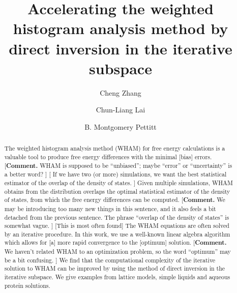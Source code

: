 \documentclass[aip,jcp,preprint,superscriptaddress]{revtex4-1}
\begin{document}
\newcommand{\vct}[1]{\mathbf{#1}}
\newcommand{\vx}{\vct{x}}
\newcommand{\vy}{\vct{y}}
\newcommand{\Z}{\mathcal{Z}}
\newcommand{\E}{\mathcal{E}}
\newcommand{\Ham}{\mathcal{H}}
\newcommand{\W}{\mathcal{W}}
\newcommand{\A}{\mathcal{A}}

\newcommand{\repl}[2]{{\color{gray} [#1] }{\color{blue} #2}}
\newcommand{\add}[1]{{\color{blue} #1}}
\newcommand{\del}[1]{{\color{gray} [#1]}}
\newcommand{\note}[1]{{\color{OliveGreen}\small [\textbf{Comment.} #1]}}



\title{Accelerating the weighted histogram analysis method
by direct inversion in the iterative subspace}


\author{Cheng Zhang}
\author{Chun-Liang Lai}
\author{B. Montgomery Pettitt}



\begin{abstract}
The weighted histogram analysis method (WHAM)
for free energy calculations
is a valuable tool to produce
free energy differences with the minimal \repl{bias}{errors}.
\note{
WHAM is supposed to be ``unbiased'';
maybe ``error'' or ``uncertainty'' is a better word?
}
%
\repl{
If we have two (or more) simulations,
we want the best statistical estimator
of the overlap of the density of states.
}
{
Given multiple simulations,
WHAM obtains
from the distribution overlaps
the optimal statistical estimator
of the density of states,
from which the free energy differences
can be computed.
}
%
\note{
We may be introducing too many new things in this sentence,
and it also feels a bit detached from the previous sentence.
The phrase ``overlap of the density of states'' is somewhat vague.
}
%
\repl{This is most often found}{The WHAM equations are often solved}
by an iterative procedure.
%
In this work,
we use a well-known linear algebra algorithm
which allows for
\repl{a}{more}
rapid convergence to the \repl{optimum}{solution}.
%
\note{
We haven't related WHAM to an optimization problem,
so the word ``optimum'' may be a bit confusing.
}
%
We find \add{that} the computational complexity of
the iterative solution to WHAM
can be improved by using the method of
direct inversion in the iterative subspace.
%
We give examples from
\add{lattice models,}
simple liquids
and aqueous protein solutions.
\end{abstract}
\end{document}
